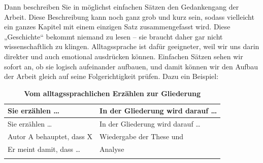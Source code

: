 \documentclass[]{book}
\theoremstyle{definition}
\theoremstyle{definition}
\theoremstyle{definition}
\theoremstyle{remark}
\begin{document}
Dann beschreiben Sie in möglichst einfachen Sätzen den Gedankengang der
Arbeit. Diese Beschreibung kann noch ganz grob und kurz sein, sodass
vielleicht ein ganzes Kapitel mit einem einzigen Satz zusammengefasst
wird. Diese „Geschichte`` bekommt niemand zu lesen -- sie braucht daher
gar nicht wissenschaftlich zu klingen. Alltagssprache ist dafür
geeigneter, weil wir uns darin direkter und auch emotional ausdrücken
können. Einfachen Sätzen sehen wir sofort an, ob sie logisch aufeinander
aufbauen, und damit können wir den Aufbau der Arbeit gleich auf seine
Folgerichtigkeit prüfen. Dazu ein Beispiel:

\begin{longtable}[]{@{}ll@{}}
\caption{\textbf{\label{tab:gliederung} Vom alltagssprachlichen Erzählen zur
Gliederung}}\tabularnewline
\toprule
\begin{minipage}[b]{0.51\columnwidth}\raggedright\strut
Sie erzählen \ldots{}\strut
\end{minipage} & \begin{minipage}[b]{0.43\columnwidth}\raggedright\strut
In der Gliederung wird darauf \ldots{}\strut
\end{minipage}\tabularnewline
\midrule
\endfirsthead
\toprule
\begin{minipage}[b]{0.51\columnwidth}\raggedright\strut
Sie erzählen \ldots{}\strut
\end{minipage} & \begin{minipage}[b]{0.43\columnwidth}\raggedright\strut
In der Gliederung wird darauf \ldots{}\strut
\end{minipage}\tabularnewline
\midrule
\endhead
\begin{minipage}[t]{0.51\columnwidth}\raggedright\strut
Autor A behauptet, dass X\strut
\end{minipage} & \begin{minipage}[t]{0.43\columnwidth}\raggedright\strut
Wiedergabe der These und \vspace{-6mm}\strut
\end{minipage}\tabularnewline
\begin{minipage}[t]{0.51\columnwidth}\raggedright\strut
Er meint damit, dass \ldots{}\strut
\end{minipage} & \begin{minipage}[t]{0.43\columnwidth}\raggedright\strut
Analyse\vspace{-6mm}\strut
\end{minipage}\tabularnewline
\begin{minipage}[t]{0.51\columnwidth}\raggedright\strut

\end{minipage}
\end{longtable}
\end{document}
